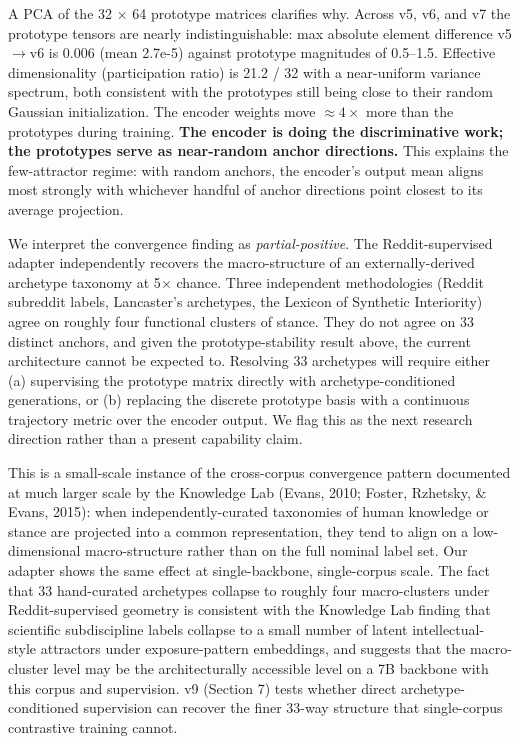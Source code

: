 \documentclass[
  11pt]{article}
\begin{document}
A PCA of the 32 \(\times\) 64 prototype matrices clarifies why. Across
v5, v6, and v7 the prototype tensors are nearly indistinguishable: max
absolute element difference v5\(\to\)v6 is 0.006 (mean 2.7e-5) against
prototype magnitudes of 0.5--1.5. Effective dimensionality
(participation ratio) is 21.2 / 32 with a near-uniform variance
spectrum, both consistent with the prototypes still being close to their
random Gaussian initialization. The encoder weights move
\(\approx 4\times\) more than the prototypes during training.
\textbf{The encoder is doing the discriminative work; the prototypes
serve as near-random anchor directions.} This explains the few-attractor
regime: with random anchors, the encoder's output mean aligns most
strongly with whichever handful of anchor directions point closest to
its average projection.

We interpret the convergence finding as \emph{partial-positive}. The
Reddit-supervised adapter independently recovers the macro-structure of
an externally-derived archetype taxonomy at 5\(\times\) chance. Three
independent methodologies (Reddit subreddit labels, Lancaster's
archetypes, the Lexicon of Synthetic Interiority) agree on roughly four
functional clusters of stance. They do not agree on 33 distinct anchors,
and given the prototype-stability result above, the current architecture
cannot be expected to. Resolving 33 archetypes will require either (a)
supervising the prototype matrix directly with archetype-conditioned
generations, or (b) replacing the discrete prototype basis with a
continuous trajectory metric over the encoder output. We flag this as
the next research direction rather than a present capability claim.

This is a small-scale instance of the cross-corpus convergence pattern
documented at much larger scale by the Knowledge Lab (Evans, 2010;
Foster, Rzhetsky, \& Evans, 2015): when independently-curated taxonomies
of human knowledge or stance are projected into a common representation,
they tend to align on a low-dimensional macro-structure rather than on
the full nominal label set. Our adapter shows the same effect at
single-backbone, single-corpus scale. The fact that 33 hand-curated
archetypes collapse to roughly four macro-clusters under
Reddit-supervised geometry is consistent with the Knowledge Lab finding
that scientific subdiscipline labels collapse to a small number of
latent intellectual-style attractors under exposure-pattern embeddings,
and suggests that the macro-cluster level may be the architecturally
accessible level on a 7B backbone with this corpus and supervision. v9
(Section 7) tests whether direct archetype-conditioned supervision can
recover the finer 33-way structure that single-corpus contrastive
training cannot.
\end{document}
